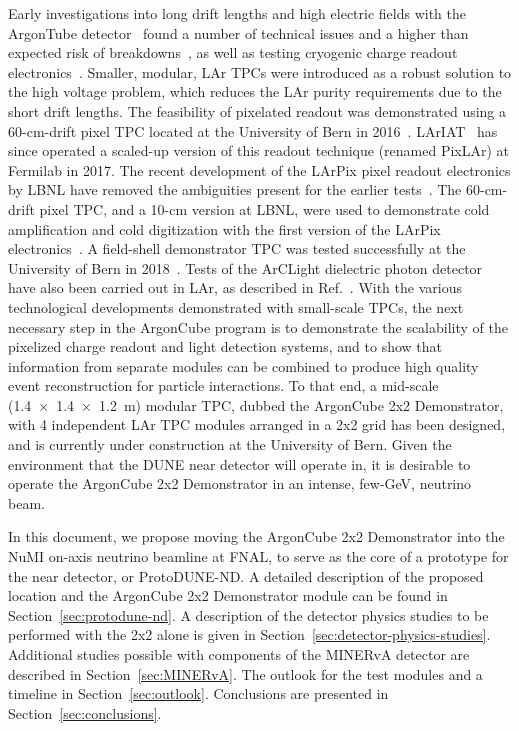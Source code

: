 Early investigations into long drift lengths and high electric fields with the ArgonTube detector~\cite{argontube_design} found a number of technical issues and a higher than expected risk of breakdowns~\cite{argontube}, as well as testing cryogenic charge readout electronics~\cite{art_cold_ero}. Smaller, modular, LAr TPCs were introduced as a robust solution to the high voltage problem, which reduces the LAr purity requirements due to the short drift lengths. The feasibility of pixelated readout was demonstrated using a 60-cm-drift pixel TPC located at the University of Bern in 2016~\cite{pixels}. LArIAT~\cite{lariat} has since operated a scaled-up version of this readout technique (renamed PixLAr) at Fermilab in 2017. The recent development of the LArPix pixel readout electronics by LBNL have removed the ambiguities present for the earlier tests~\cite{larpix}. The 60-cm-drift pixel TPC, and a 10-cm version at LBNL, were used to demonstrate cold amplification and cold digitization with the first version of the LArPix electronics~\cite{larpix}. A field-shell demonstrator TPC was tested successfully at the University of Bern in 2018~\cite{argoncube_fd}. Tests of the ArCLight dielectric photon detector have also been carried out in LAr, as described in Ref.~\cite{arclight}. With the various technological developments demonstrated with small-scale TPCs, the next necessary step in the ArgonCube program is to demonstrate the scalability of the pixelized charge readout and light detection systems, and to show that information from separate modules can be combined to produce high quality event reconstruction for particle interactions. To that end, a mid-scale (\SI[product-units=repeat]{1.4x1.4x1.2}{\metre}) modular TPC, dubbed the ArgonCube 2x2 Demonstrator, with 4 independent LAr TPC modules arranged in a 2x2 grid has been designed, and is currently under construction at the University of Bern. Given the environment that the DUNE near detector will operate in, it is desirable to operate the ArgonCube 2x2 Demonstrator in an intense, few-GeV, neutrino beam.


In this document, we propose moving the ArgonCube 2x2 Demonstrator into the NuMI on-axis neutrino beamline at FNAL, to serve as the core of a prototype for the near detector, or ProtoDUNE-ND. A detailed description of the proposed location and the ArgonCube 2x2 Demonstrator module can be found in Section~\ref{sec:protodune-nd}. A description of the detector physics studies to be performed with the 2x2 alone is given in Section~\ref{sec:detector-physics-studies}. Additional studies possible with components of the MINERvA detector are described in Section~\ref{sec:MINERvA}. The outlook for the test modules and a timeline in Section~\ref{sec:outlook}. Conclusions are presented in Section~\ref{sec:conclusions}.

